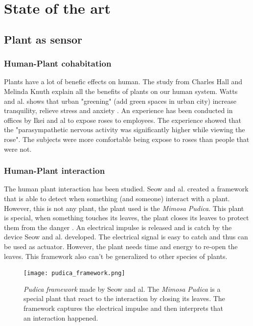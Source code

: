 \section{State of the art}

\subsection{Plant as sensor}

\subsubsection{Human-Plant cohabitation}

Plants have a lot of benefic effects on human. The study from Charles Hall and Melinda Knuth \cite{hallUpdateLiteratureSupporting2019}
explain all the benefits of plants on our human system.
Watts and al. shows that urban "greening" (add green spaces in urban city)
increase tranquility, relieve stress and anxiety \cite{wattsEffectsGreeningUrban2017}.
An experience has been conducted in offices by Ikei and al \cite{ikeiPhysiologicalPsychologicalRelaxing2014}
to expose roses to employees. The experience showed that the "parasympathetic nervous activity was significantly higher while viewing the rose". The subjects were more comfortable
being expose to roses than people that were not.

\subsubsection{Human-Plant interaction}

The human plant interaction has been studied. Seow and al. \cite{seowPudicaFrameworkDesigning2022}
created a framework that is able to detect when something (and someone) interact with a plant.
However, this is not any plant, the plant used is the \textit{Mimosa Pudica}. This plant is special,
when something touches its leaves, the plant closes its leaves to protect them from the danger \cite{volkovMimosaPudicaElectrical2010}. 
An electrical impulse is released and is catch by the device Seow and al. developed. The electrical 
signal is easy to catch and thus can be used as actuator. However, the plant needs time and energy
to re-open the leaves. This framework also can't be generalized to other species of plants.

\begin{figure}[h!]
    \centering
    \texttt{[image: pudica\_framework.png]}
    \caption{\textit{Pudica framework} made by Seow and al. The \textit{Mimosa Pudica} is a
    special plant that react to the interaction by closing its leaves. The framework
    captures the electrical impulse and then interprets that an interaction happened.} 
    \vspace{0.1cm}
    \label{fig:pudica_framework}
\end{figure}

